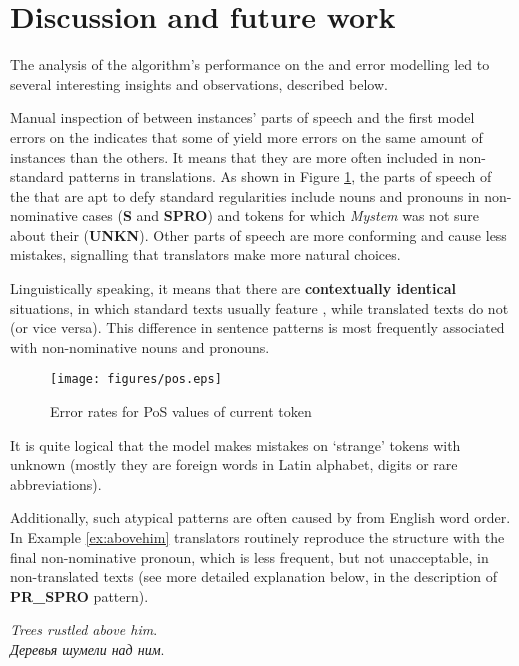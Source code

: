 \documentclass[output=paper]{langsci/langscibook.cls}
\begin{document}
\section{Discussion and future work}\label{sec:discussion}
The analysis of the algorithm's performance on the  and error modelling led to several interesting insights and observations, described below.

Manual inspection of  between instances' parts of speech and the first model errors on the  indicates that some of  yield more errors on the same amount of instances than the others. It means that they are more often included in non-standard  patterns in translations. As shown in Figure \ref{fig:pos}, the parts of speech of the  that are apt to defy standard  regularities include nouns and pronouns in non-nominative cases (\textbf{S} and \textbf{SPRO}) and tokens for which \textit{Mystem} was not sure about their  (\textbf{UNKN}). Other parts of speech are more conforming and cause less mistakes, signalling that translators make more natural choices.

Linguistically speaking, it means that there are \textbf{contextually identical} situations, in which standard  texts usually feature , while translated texts do not (or vice versa). This difference in sentence patterns is most frequently associated with non-nominative nouns and pronouns.

\begin{figure}
\caption{Error rates for PoS values of current token}
\texttt{[image: figures/pos.eps]}
\label{fig:pos}
\end{figure}

It is quite logical that the model makes mistakes on `strange' tokens with unknown  (mostly they are foreign words in Latin alphabet, digits or rare abbreviations).  

Additionally, such atypical patterns are often caused by  from English word order. In Example \ref{ex:abovehim} translators routinely reproduce the structure with the final non-nominative pronoun, which is less frequent, but not unacceptable, in non-translated  texts (see more detailed explanation below, in the description of \textbf{PR\_SPRO} pattern).

\ea
\label{ex:abovehim}
\textit{Trees rustled above him}.\\
\glt
\textit{Деревья шумели над ним}. 
\z
\end{document}
